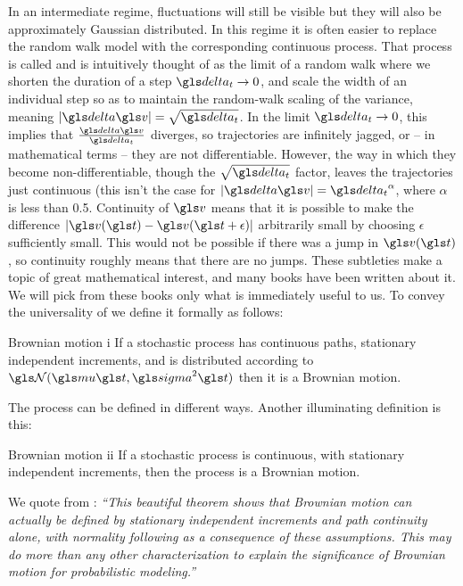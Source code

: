 In an intermediate regime, fluctuations will still be visible but they will also be approximately 
Gaussian distributed. In this regime it is often easier to replace the random walk model 
with the corresponding continuous process. That process is called \BM and is intuitively thought
of as the limit of a random walk where we shorten the duration of a step $\dt \to 0$, and 
scale the width of an individual step so as to maintain the random-walk scaling of the variance, meaning
$|\d\gv|=\sqrt{\dt}$. In the limit $\dt\to0$, this implies that $\frac{\d\gv}{\dt}$ diverges, so \BM trajectories 
are infinitely jagged, or -- in mathematical terms -- they are not differentiable. However, the way in
which they become non-differentiable, though the $\sqrt{\dt}$ factor, leaves the 
trajectories just continuous (this isn't the case for $|\d\gv|=\dt^\alpha$, where $\alpha$ is less than 0.5. 
Continuity of $\gv$ 
means that it is possible to make the difference $|\gv(\t)-\gv(\t+\epsilon)|$ arbitrarily small by choosing
$\epsilon$ sufficiently small. This would not be possible if there was a jump in $\gv(\t)$, so continuity 
roughly means that there are no jumps. These subtleties make \BM a topic of great mathematical
interest, and many books have been written about it. We will pick from these books only what is 
immediately useful to us.
To convey the universality of \BM we define it formally as follows:

\begin{defn}{Brownian motion i}
If a stochastic process has continuous paths, stationary independent increments, and is distributed according to 
$\mathcal{\N}(\gmu \t, \gsigma^2 \t)$ then it is a Brownian motion.
\end{defn}

The process can be defined in different ways. Another illuminating definition is this:

\begin{defn}{Brownian motion ii}
If a stochastic process is continuous, with stationary independent increments, then the process is a Brownian 
motion.
\end{defn}

We quote from \cite{Harrison2013}: {\it ``This beautiful theorem shows that Brownian motion can actually be defined
by stationary independent increments and path continuity alone, with normality following as a consequence 
of these assumptions. This may do more than any other characterization to explain the significance of 
Brownian motion for probabilistic modeling.''}

